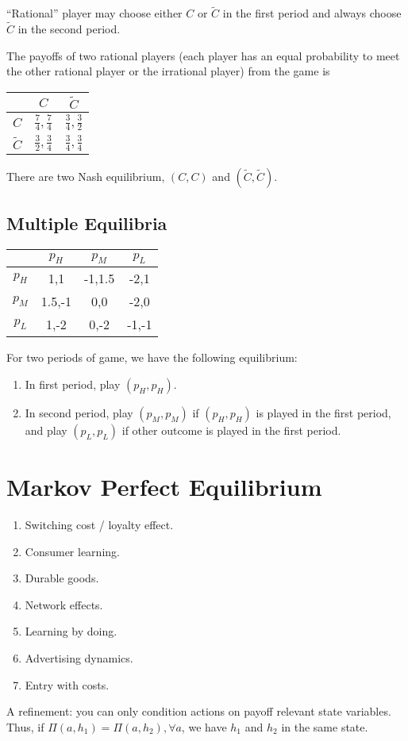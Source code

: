 \documentclass[11pt]{elegantbook}
\begin{document}
``Rational'' player may choose either $C$ or $\tilde{C}$ in the first period and always choose $\tilde{C}$ in the second period.

The payoffs of two rational players (each player has an equal probability to meet the other rational player or the irrational player) from the game is
\begin{center}
    \begin{tabular}{ccc}
        \hline
            &$C$ &$\tilde{C}$\\
        \hline
            $C$& $\frac{7}{4},\frac{7}{4}$ & $\frac{3}{4},\frac{3}{2}$\\
            $\tilde{C}$& $\frac{3}{2},\frac{3}{4}$& $\frac{3}{4},\frac{3}{4}$\\
        \hline
    \end{tabular}
\end{center}
There are two Nash equilibrium, $(C,C)$ and $(\tilde{C},\tilde{C})$.

\subsection{Multiple Equilibria}
\begin{center}
    \begin{tabular}{cccc}
        \hline
            &$p_H$ & $p_M$ & $p_L$\\
        \hline
        $p_H$& 1,1 & -1,1.5 & -2,1\\
        $p_M$& 1.5,-1& 0,0 & -2,0\\
        $p_L$& 1,-2 &0,-2 &-1,-1\\
        \hline
    \end{tabular}
\end{center}
For two periods of game, we have the following equilibrium:
\begin{enumerate}
    \item In first period, play $(p_H,p_H)$.
    \item In second period, play $(p_M,p_M)$ if $(p_H,p_H)$ is played in the first period, and play $(p_L,p_L)$ if other outcome is played in the first period.
\end{enumerate}

\section{Markov Perfect Equilibrium}
\begin{enumerate}
    \item Switching cost / loyalty effect.
    \item Consumer learning.
    \item Durable goods.
    \item Network effects.
    \item Learning by doing.
    \item Advertising dynamics.
    \item Entry with costs.
\end{enumerate}
A refinement: you can only condition actions on payoff relevant state variables. Thus, if $\Pi(a,h_1)=\Pi(a,h_2),\forall a$, we have $h_1$ and $h_2$ in the same state.
\end{document}
